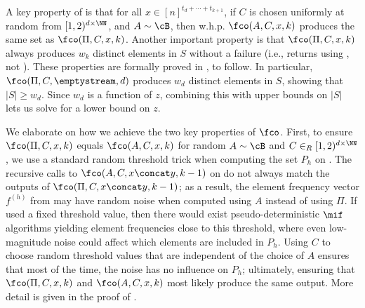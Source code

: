 \begin{itemize}
\begin{itemize}
\begin{algorithm}[htb]
\end{algorithm}

A key property of \fco is that for all $x \in [n]^{t_d + \cdots + t_{k+1}}$,
if $C$ is chosen uniformly at random from $[1,2)^{d \times \NN}$, and $A \sim
\cB$, then w.h.p. $\fco(A, C, x, k)$ produces the same set as $\fco(\Pi, C, x,
k)$. Another important property is that $\fco(\Pi, C, x, k)$ always produces
$w_k$ distinct elements in $S$ without a failure (i.e., returns using
, not ). These properties
are formally proved in , to follow.  In
particular, $\fco(\Pi, C, \emptystream, d)$ produces $w_d$ distinct elements
in $S$, showing that $|S| \ge w_d$. Since $w_d$ is a function of $z$,
combining this with upper bounds on $|S|$ lets us solve for a lower bound on
$z$.

We elaborate on how we achieve the two key properties of $\fco$. First, to
ensure $\fco(\Pi,C,x,k)$ equals $\fco(A,C,x,k)$ for random $A \sim \cB$ and $C
\in_R [1,2)^{d \times \NN}$, we use a standard random threshold trick when
computing the set $P_h$ on . The recursive calls to
$\fco(A, C, x \concat y, k-1)$ on  do not always
match the outputs of $\fco(\Pi, C, x \concat y, k-1)$; as a result, the
element frequency vector $f^{(h)}$ from  may have
random noise when computed using $A$ instead of using $\Pi$. If
 used a fixed threshold value, then there would exist
pseudo-deterministic $\mif$ algorithms yielding element frequencies close to
this threshold, where even low-magnitude noise could affect which elements are
included in $P_h$.  Using $C$ to choose random threshold values that are
independent of the choice of $A$ ensures that most of the time, the noise has
no influence on $P_h$; ultimately, ensuring that $\fco(\Pi,C,x,k)$ and
$\fco(A,C,x,k)$ most likely produce the same output. More detail is given in
the proof of .


\end{itemize}
\end{itemize}
